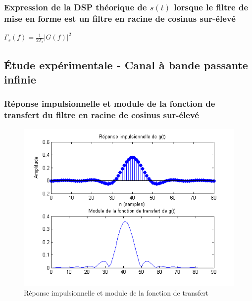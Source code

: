 \documentclass[11pt]{article}
\begin{document}
		
		\subsubsection{Expression de la DSP théorique de $s(t)$ lorsque le filtre de mise en forme est un filtre en racine de cosinus sur-élevé}
			$\Gamma_s(f) = \frac{1}{2T_s}\lvert G(f) \rvert^2$
		
	\subsection{Étude expérimentale - Canal à bande passante infinie}
		\subsubsection{Réponse impulsionnelle et module de la fonction de transfert du filtre en racine de cosinus sur-élevé}
			\begin{figure}[!h]
				\centering
				\includegraphics[scale=0.5]{images/Q421.png}
				\caption{Réponse impulsionnelle et module de la fonction de transfert}
				\label{Q421}
			\end{figure}
			
		
		\newpage
\end{document}
